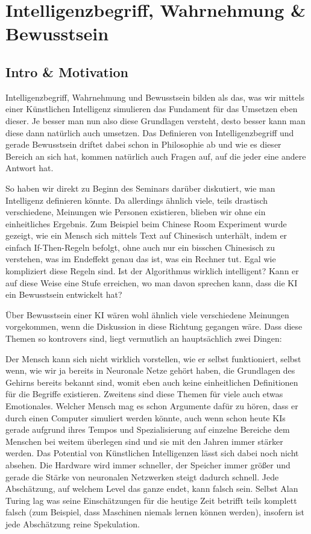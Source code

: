 
\chapter{Intelligenzbegriff, Wahrnehmung \& Bewusstsein}
\section{Intro \& Motivation}
Intelligenzbegriff, Wahrnehmung und Bewusstsein bilden als das, was wir mittels einer Künstlichen Intelligenz simulieren das Fundament für das Umsetzen eben dieser.
Je besser man nun also diese Grundlagen versteht, desto besser kann man diese dann natürlich auch umsetzen.
Das Definieren von Intelligenzbegriff und gerade Bewusstsein driftet dabei schon in Philosophie ab und wie es dieser Bereich an sich hat, kommen natürlich auch Fragen auf, auf die jeder eine andere Antwort hat.

So haben wir direkt zu Beginn des Seminars darüber diskutiert, wie man Intelligenz definieren könnte.
Da allerdings ähnlich viele, teils drastisch verschiedene, Meinungen wie Personen existieren, blieben wir ohne ein einheitliches Ergebnis.
Zum Beispiel beim Chinese Room Experiment wurde gezeigt, wie ein Mensch sich mittels Text auf Chinesisch unterhält, indem er einfach If-Then-Regeln befolgt, ohne auch nur ein bisschen Chinesisch zu verstehen, was im Endeffekt genau das ist, was ein Rechner tut.
Egal wie kompliziert diese Regeln sind.
Ist der Algorithmus wirklich intelligent? Kann er auf diese Weise eine Stufe erreichen, wo man davon sprechen kann, dass die KI ein Bewusstsein entwickelt hat?

Über Bewusstsein einer KI wären wohl ähnlich viele verschiedene Meinungen vorgekommen, wenn die Diskussion in diese Richtung gegangen wäre.
Dass diese Themen so kontrovers sind, liegt vermutlich an hauptsächlich zwei Dingen:

Der Mensch kann sich nicht wirklich vorstellen, wie er selbst funktioniert, selbst wenn, wie wir ja bereits in Neuronale Netze gehört haben, die Grundlagen des Gehirns bereits bekannt sind, womit eben auch keine einheitlichen Definitionen für die Begriffe existieren.
Zweitens sind diese Themen für viele auch etwas Emotionales.
Welcher Mensch mag es schon Argumente dafür zu hören, dass er durch einen Computer simuliert werden könnte, auch wenn schon heute KIs gerade aufgrund ihres Tempos und Spezialisierung auf einzelne Bereiche dem Menschen bei weitem überlegen sind und sie mit den Jahren immer stärker werden.
Das Potential von Künstlichen Intelligenzen lässt sich dabei noch nicht absehen.
Die Hardware wird immer schneller, der Speicher immer größer und gerade die Stärke von neuronalen Netzwerken steigt dadurch schnell.
Jede Abschätzung, auf welchem Level das ganze endet, kann falsch sein.
Selbst Alan Turing lag was seine Einschätzungen für die heutige Zeit betrifft teils komplett falsch (zum Beispiel, dass Maschinen niemals lernen können werden), insofern ist jede Abschätzung reine Spekulation.

